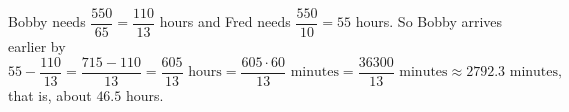 Bobby needs $\dfrac{550}{65}=\dfrac{110}{13}$ hours and Fred needs $\dfrac{550}{10}=55$ hours. So Bobby arrives earlier by
\[55-\dfrac{110}{13}=\dfrac{715-110}{13}=\dfrac{605}{13}\text{ hours}=\dfrac{605\cdot60}{13}\text{ minutes}=\boxed{\dfrac{36300}{13}\text{ minutes}}\approx2792.3\text{ minutes},\]
that is, about $46.5$ hours.
